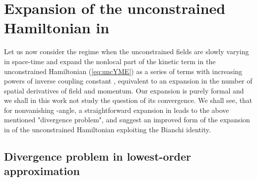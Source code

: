 \documentclass[a4paper,12pt]{article}
\begin{document}

\section{Expansion of the unconstrained Hamiltonian in \coordHE{}}


\label{secIV}

Let us now consider the regime when the unconstrained
fields are slowly varying in space-time and expand
the nonlocal part of the kinetic term in the unconstrained
Hamiltonian (\ref{eq:uncYME}) as a series of terms with increasing
powers of inverse coupling constant \coordHE{},
equivalent to an expansion in the
number of spatial derivatives of field and momentum.
Our expansion is purely formal and we shall in this work not
study the question of its convergence.
We shall see, that for nonvanishing \myHighlight{$\theta$}\coordHE{}-angle,
a straightforward expansion in \coordHE{} leads to the above mentioned
"divergence problem", and suggest an
improved form of the expansion in \coordHE{} of the unconstrained Hamiltonian
exploiting the Bianchi identity.


\subsection{Divergence problem in lowest-order approximation}

\label{Sec:IV1}
\end{document}
